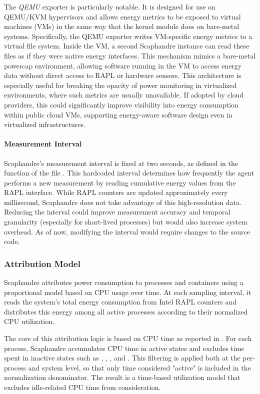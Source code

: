 The \textit{QEMU} exporter is particularly notable. It is designed for use on QEMU/KVM hypervisors and allows energy metrics to be exposed to virtual machines (VMs) in the same way that the  kernel module does on bare-metal systems. Specifically, the QEMU exporter writes VM-specific energy metrics to a virtual file system. Inside the VM, a second Scaphandre instance can read these files as if they were native energy interfaces. This mechanism mimics a bare-metal powercap environment, allowing software running in the VM to access energy data without direct access to RAPL or hardware sensors. This architecture is especially useful for breaking the opacity of power monitoring in virtualized environments, where such metrics are usually unavailable. If adopted by cloud providers, this could significantly improve visibility into energy consumption within public cloud VMs, supporting energy-aware software design even in virtualized infrastructures.

\paragraph{Measurement Interval}

Scaphandre's measurement interval is fixed at two seconds, as defined in the  function of the file . This hardcoded interval determines how frequently the agent performs a new measurement by reading cumulative energy values from the RAPL interface. While RAPL counters are updated approximately every millisecond, Scaphandre does not take advantage of this high-resolution data. Reducing the interval could improve measurement accuracy and temporal granularity (especially for short-lived processes) but would also increase system overhead. As of now, modifying the interval would require changes to the source code.

\subsubsection{Attribution Model}
\label{sec:scaphandre-attribution}

Scaphandre attributes power consumption to processes and containers using a proportional model based on CPU usage over time. At each sampling interval, it reads the system's total energy consumption from Intel RAPL counters and distributes this energy among all active processes according to their normalized CPU utilization.

The core of this attribution logic is based on CPU time as reported in . For each process, Scaphandre accumulates CPU time in active states and excludes time spent in inactive states such as , , , and . This filtering is applied both at the per-process and system level, so that only time considered "active" is included in the normalization denominator. The result is a time-based utilization model that excludes idle-related CPU time from consideration.

